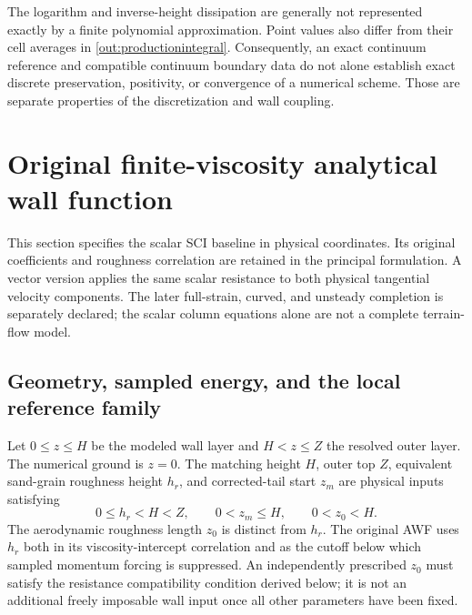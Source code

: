 \documentclass[11pt,a4paper]{article}
\numberwithin{equation}{section}
\begin{document}
The logarithm and inverse-height dissipation are generally not
represented exactly by a finite polynomial approximation. Point values
also differ from their cell averages in
\cref{out:productionintegral}. Consequently, an exact continuum
reference and compatible continuum boundary data do not alone establish
exact discrete preservation, positivity, or convergence of a numerical
scheme. Those are separate properties of the discretization and wall
coupling.

\section{Original finite-viscosity analytical wall function}
\label{awf:original}

This section specifies the scalar SCI baseline \citep{SCI2006} in
physical coordinates. Its original coefficients and roughness
correlation are retained in the principal formulation. A vector
version applies the same scalar resistance to both physical tangential
velocity components. The later full-strain, curved, and unsteady
completion is separately declared; the scalar column equations alone
are not a complete terrain-flow model.

\subsection{Geometry, sampled energy, and the local reference family}
\label{awf:geometry}

Let $0\leq z\leq H$ be the modeled wall layer and $H<z\leq Z$ the
resolved outer layer. The numerical ground is $z=0$. The matching
height $H$, outer top $Z$, equivalent sand-grain roughness height
$h_r$, and corrected-tail start $z_m$ are physical inputs satisfying
\begin{equation}
 0\leq h_r<H<Z,\qquad 0<z_m\leq H,\qquad 0<z_0<H.
 \label{awf:heights}
\end{equation}
The aerodynamic roughness length $z_0$ is distinct from $h_r$.
The original AWF uses $h_r$ both in its viscosity-intercept correlation
and as the cutoff below which sampled momentum forcing is suppressed.
An independently prescribed $z_0$ must satisfy the resistance
compatibility condition derived below; it is not an additional freely
imposable wall input once all other parameters have been fixed.
\end{document}
